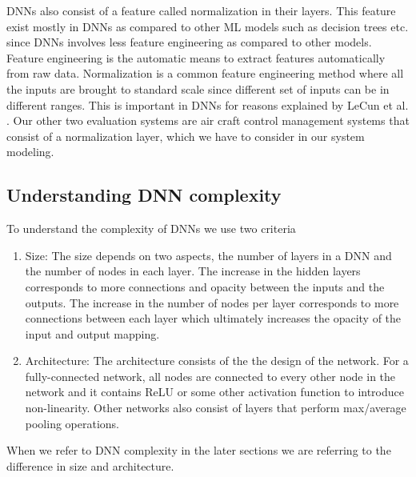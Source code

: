 \ac{DNN}s also consist of a feature called normalization in their layers. 
This feature exist mostly in \ac{DNN}s as compared to other \ac{ML} models such as decision trees etc. since \ac{DNN}s involves less feature engineering as compared to other models. 
Feature engineering is the automatic means to extract features automatically from raw data. 
Normalization is a common feature engineering method where all the inputs are brought to standard scale since different set of inputs can be in different ranges. 
This is important in \ac{DNN}s for reasons explained by  LeCun et al.  \cite{10.5555/645754.668382}.
Our other two evaluation systems are air craft  control management systems \cite{10.1007/978-3-319-63387-9_5} that consist of a normalization layer, 
which we have to consider in our system modeling. 
\subsection{Understanding DNN complexity}
\label{dnncomplexity}
To understand the complexity of \ac{DNN}s we use two criteria
\begin{enumerate}
	\item Size: The size depends on two aspects, the number of layers in a \ac{DNN} and the number of nodes in each layer. 
    The increase in the hidden layers corresponds to more connections and opacity between the inputs and the outputs. 
    The increase in the number of nodes per layer corresponds to more connections between each layer which ultimately increases the opacity of the input and output mapping. 
	\item Architecture: The architecture consists of the the design of the network. 
	For a fully-connected network, all nodes are connected to every other node in the network and it contains ReLU or some other activation function to introduce non-linearity.
	Other networks also consist of layers that perform max/average pooling operations. 
	
\end{enumerate}
When we refer to \ac{DNN} complexity in the later sections we are referring to the difference in size and architecture.


